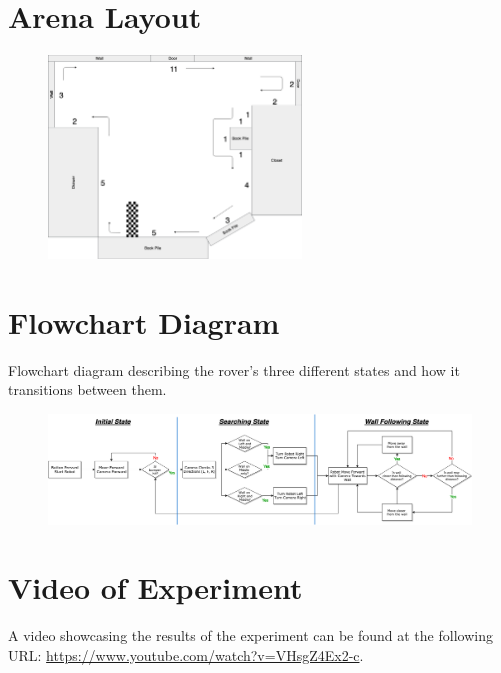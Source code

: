 \documentclass[a4paper,12pt,twocolumn]{article}
\begin{document}
\onecolumn
\begin{appendices}

\section{Arena Layout}
\label{sec:arena-layout}
\begin{figure}[ht]
\centering
\includegraphics[width=0.60\textwidth]{figures/arena-layout/Arena-Layout.png}
\end{figure}

\section{Flowchart Diagram}
\label{sec:flowchart}
Flowchart diagram describing the rover's three different states and how it transitions between them.
\begin{figure}[ht]
\centerline{\includegraphics[width=1.25\textwidth]{figures/flowchart/System-Flowchart.png}}
\end{figure}

\section{Video of Experiment}
\label{sec:video-experiment}
A video showcasing the results of the experiment can be found at the following URL: \url{https://www.youtube.com/watch?v=VHsgZ4Ex2-c}.


\end{appendices}
\end{document}
